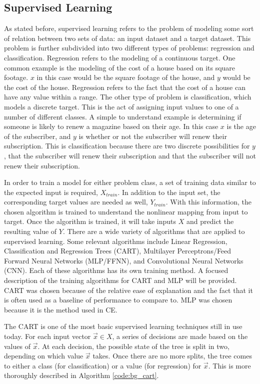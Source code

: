 	\subsection{Supervised Learning}
	\par As stated before, supervised learning refers to the problem of modeling some sort of relation between two sets of data: an input dataset and a target dataset. This problem is further subdivided into two different types of problems: regression and classification. Regression refers to the modeling of a continuous target. One common example is the modeling of the cost of a house based on its square footage. $x$ in this case would be the square footage of the house, and $y$ would be the cost of the house. Regression refers to the fact that the cost of a house can have any value within a range. The other type of problem is classification, which models a discrete target. This is the act of assigning input values to one of a number of different classes. A simple to understand example is determining if someone is likely to renew a magazine based on their age. In this case $x$ is the age of the subscriber, and $y$ is whether or not the subscriber will renew their subscription. This is classification because there are two discrete possibilities for $y$, that the subscriber will renew their subscription and that the subscriber will not renew their subscription.  
	\par In order to train a model for either problem class, a set of training data similar to the expected input is required, $X_{train}$. In addition to the input set, the corresponding target values are needed as well, $Y_{train}$. With this information, the chosen algorithm is trained to understand the nonlinear mapping from input to target. Once the algorithm is trained, it will take inputs $X$ and predict the resulting value of $Y$. There are a wide variety of algorithms that are applied to supervised learning. Some relevant algorithms include Linear Regression, Classification and Regression Trees (CART), Multilayer Perceptrons/Feed Forward Neural Networks (MLP/FFNN), and Convolutional Neural Networks (CNN). Each of these algorithms has its own training method. A focused description of the training algorithms for CART and MLP will be provided. CART was chosen because of the relative ease of explanation and the fact that it is often used as a baseline of performance to compare to. MLP was chosen because it is the method used in CE.
	\par The CART is one of the most basic supervised learning techniques still in use today. For each input vector $\vec{x} \in X$, a series of decisions are made based on the values of $\vec{x}$. At each decision, the possible state of the tree is split in two, depending on which value $\vec{x}$ takes. Once there are no more splits, the tree comes to either a class (for classification) or a value (for regression) for $\vec{x}$. This is more thoroughly described in Algorithm \ref{code:bg_cart}.
